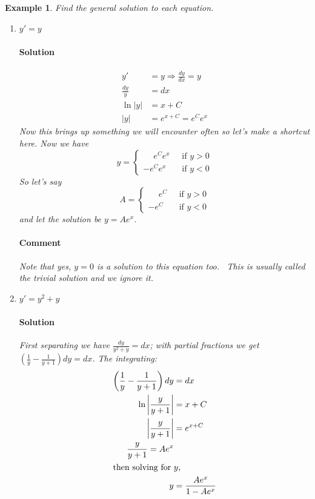 \documentclass[letterpaper, 11pt, openany]{book}
\theoremstyle{mytheoremstyle}
\theoremstyle{myexamplestyle}
\newtheorem{example}{Example}[section]
\newenvironment{solution}{\paragraph{\sffamily \smaller \fontseries{b}\selectfont Solution}}{\hfill\faSquare}
\newenvironment{commentary}{\paragraph{\sffamily \smaller \fontseries{b}\selectfont Comment}}{}
\begin{document}
\begin{example}\label{de-separable-general}
    Find the general solution to each equation.
    \begin{enumerate}
        \item \(y' = y\)
        \begin{solution}
            \begin{align*}
            y' &= y \Rightarrow \frac{dy}{dx} = y\\
            \frac{dy}{y} &= dx\\
            \ln |y| &= x + C\\
            |y| &= e^{x + C} = e^{C}e^{x}
        \end{align*}
        Now this brings up something we will encounter often so let's make a shortcut here. Now we have
        \[y = \begin{cases}
            \phantom{-}e^{C}e^{x}\; &\text{ if } y > 0\\
            -e^{C}e^{x}\; &\text{ if } y < 0
        \end{cases}\]
        So let's say
        \[
            A = \begin{cases}
                \phantom{-}e^{C}\; &\text{ if } y > 0\\
                -e^{C}\; &\text{ if } y < 0
            \end{cases}
        \]
        and let the solution be \(y = Ae^{x}\).
        \end{solution}
        \begin{commentary}
            Note that yes, \(y = 0\) is a solution to this equation too. \faMeh \, This is usually called the \textit{trivial solution} and we ignore it.
        \end{commentary}

        \item \(y' = y^2 + y\)
        \begin{solution}
            First separating we have \(\displaystyle \frac{dy}{y^2 + y} = dx\); with partial fractions we get \(\displaystyle \left(\frac{1}{y} - \frac{1}{y+1}\right)dy = dx\). The integrating:
            \begin{align*}
                \left(\frac{1}{y} - \frac{1}{y+1}\right)dy &= dx\\
                \ln \left| \frac{y}{y+1}\right| &= x + C\\
                \left| \frac{y}{y+1}\right| &= e^{x + C}\\
                \frac{y}{y+1} = A e^{x}\\
                \intertext{then solving for \(y\),}
                y &= \frac{Ae^{x}}{1 - Ae^{x}}
            \end{align*}
        \end{solution}


\end{enumerate}
\end{example}
\end{document}
